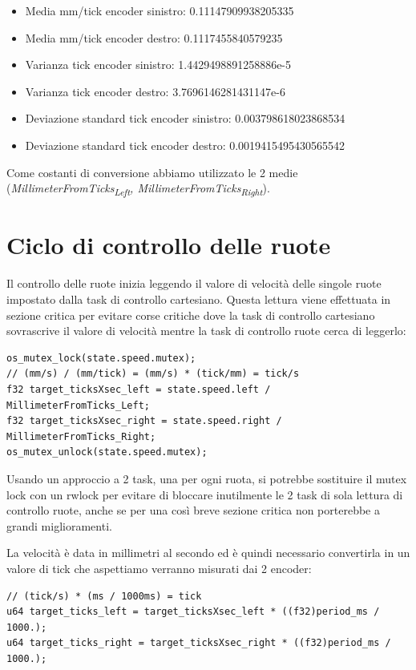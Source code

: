\documentclass[11pt]{article}
\begin{document}
\begin{itemize}
\item Media mm/tick encoder sinistro:            0.11147909938205335
\item Media mm/tick encoder destro:              0.1117455840579235
\item Varianza tick encoder sinistro:            1.4429498891258886e-5
\item Varianza tick encoder destro:              3.7696146281431147e-6
\item Deviazione standard tick encoder sinistro: 0.003798618023868534
\item Deviazione standard tick encoder destro:   0.0019415495430565542
\end{itemize}

Come costanti di conversione abbiamo utilizzato le 2 medie (\emph{MillimeterFromTicks\textsubscript{Left}, MillimeterFromTicks\textsubscript{Right}}).
\section{Ciclo di controllo delle ruote}
\label{sec:org781a9e5}
Il controllo delle ruote inizia leggendo il valore di velocità delle singole ruote impostato dalla task di controllo cartesiano. Questa lettura viene effettuata in sezione critica per evitare corse critiche dove la task di controllo cartesiano sovrascrive il valore di velocità mentre la task di controllo ruote cerca di leggerlo:
\begin{verbatim}
os_mutex_lock(state.speed.mutex);
// (mm/s) / (mm/tick) = (mm/s) * (tick/mm) = tick/s
f32 target_ticksXsec_left = state.speed.left / MillimeterFromTicks_Left;
f32 target_ticksXsec_right = state.speed.right / MillimeterFromTicks_Right;
os_mutex_unlock(state.speed.mutex);
\end{verbatim}
Usando un approccio a 2 task, una per ogni ruota, si potrebbe sostituire il mutex lock con un rwlock per evitare di bloccare inutilmente le 2 task di sola lettura di controllo ruote, anche se per una così breve sezione critica non porterebbe a grandi miglioramenti.

La velocità è data in millimetri al secondo ed è quindi necessario convertirla in un valore di tick che aspettiamo verranno misurati dai 2 encoder:
\begin{verbatim}
// (tick/s) * (ms / 1000ms) = tick
u64 target_ticks_left = target_ticksXsec_left * ((f32)period_ms / 1000.);
u64 target_ticks_right = target_ticksXsec_right * ((f32)period_ms / 1000.);
\end{verbatim}
\end{document}
